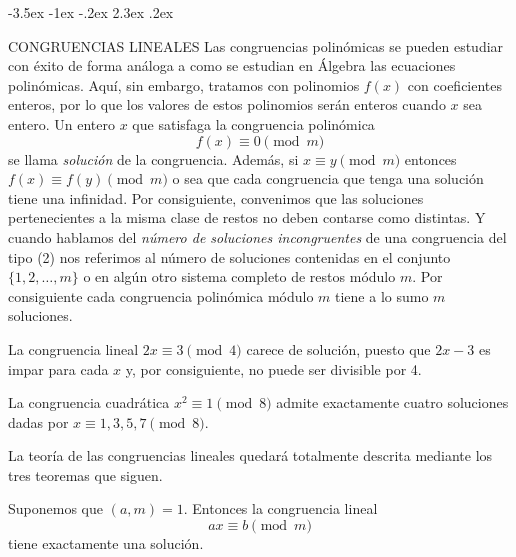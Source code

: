 \documentclass[12pt,a4paper]{book}
\makeatletter
\renewcommand\section{\@startsection{section}{1}{\z@}%
  {-3.5ex \@plus -1ex \@minus -.2ex}%
  {2.3ex \@plus .2ex}%
  {\normalfont\Large\bfseries\raggedright}}
\makeatother
\begin{document}
    \section{CONGRUENCIAS LINEALES}
    Las congruencias polinómicas se pueden estudiar con éxito de forma análoga a como se
    estudian en Álgebra las ecuaciones polinómicas. Aquí, sin embargo, tratamos con
    polinomios $f(x)$ con coeficientes enteros, por lo que los valores de estos
    polinomios serán enteros cuando $x$ sea entero. Un entero $x$ que satisfaga la
    congruencia polinómica
    \begin{equation}
        f(x)\equiv0\pmod{m}
    \end{equation}
    se llama \textit{solución} de la congruencia. Además, si $x\equiv y\pmod{m}$ entonces
    $f(x)\equiv f(y)\pmod{m}$ o sea que cada congruencia que tenga una solución tiene una
    infinidad. Por consiguiente, convenimos que las soluciones pertenecientes a la misma
    clase de restos no deben contarse como distintas. Y cuando hablamos del
    \textit{número de soluciones incongruentes} de una congruencia del tipo (2) nos
    referimos al número de soluciones contenidas en el conjunto $\{1,2,\dots,m\}$ o en
    algún otro sistema completo de restos módulo $m$. Por consiguiente cada congruencia
    polinómica módulo $m$ tiene a lo sumo $m$ soluciones.

    \begin{ejemplo}
        La congruencia lineal $2x\equiv3\pmod{4}$ carece de solución, puesto que $2x-3$ es
        impar para cada $x$ y, por consiguiente, no puede ser divisible por 4.
    \end{ejemplo}

    \begin{ejemplo}
        La congruencia cuadrática $x^{2}\equiv1\pmod{8}$ admite exactamente cuatro
        soluciones dadas por $x\equiv1,3,5,7\pmod{8}$.
    \end{ejemplo}

    La teoría de las congruencias lineales quedará totalmente descrita mediante los tres
    teoremas que siguen.

    \begin{teorema}
        Suponemos que $(a,m)=1$. Entonces la congruencia lineal
        \begin{equation}
            ax\equiv b\pmod{m}
        \end{equation}
        tiene exactamente una solución.
    \end{teorema}
\end{document}

